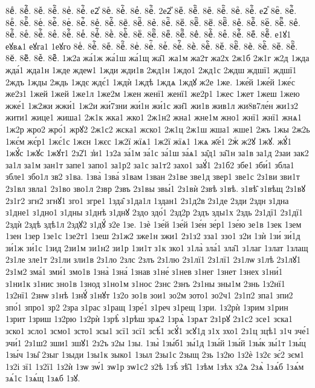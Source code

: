 {8еⷣ.
8еⷣ҇.
8еⷤ.
8еⷤ҇.
8еⷥ.
8еⷥ҇.
е2ⷦ
8еⷦ.
8еⷦ҇.
8еⷧ.
8еⷧ҇.
2е2ⷨ
8еⷨ.
8еⷨ҇.
8еⷩ.
8еⷩ҇.
8еⷪ.
8еⷪ҇.
е2ⷫ
8еⷫ.
8еⷫ҇.
8еⷬ.
8еⷬ҇.
8еⷭ.
8еⷭ҇.
8еⷮ.
8еⷮ҇.
8еⷯ.
8еⷯ҇.
8еⷰ.
8еⷰ҇.
8еⷱ.
8еⷱ҇.
8еⷲ.
8еⷲ҇.
8еⷳ.
8еⷳ҇.
8еⷴ.
8еⷴ҇.
8еⷵ.
8еⷵ҇.
8еⷶ.
8еⷶ҇.
8еⷷ.
8еⷷ҇.
8еⷸ.
8еⷸ҇.
8еⷹ.
8еⷹ҇.
8еⷺ.
8еⷺ҇.
8еⷻ.
8еⷻ҇.
8еⷼ.
8еⷼ҇.
8еⷽ.
8еⷽ҇.
8еⷾ.
8еⷾ҇.
8еⷿ.
8еⷿ҇.
е1ꙋ1
еꙋвѧ1
еꙋга1
1еꙋго
8еꙴ.
8еꙴ҇.
8еꙵ.
8еꙵ҇.
8еꙶ.
8еꙶ҇.
8еꙷ.
8еꙷ҇.
8еꙸ.
8еꙸ҇.
8еꙹ.
8еꙹ҇.
8еꙺ.
8еꙺ҇.
8еꙻ.
8еꙻ҇.
8е꙼.
8е꙼҇.
8е꙽.
8е꙽҇.
1ж2а
жа́1ж
жа́1ш
жа́1щ
жа̑1
жа1м
жа2т
жа2х
2ж1б
2ж1г
ж2д
1жда
жда́1
жда1н
1жде
ждеѡ1
1жди
жди1в
2жд1н
1ждо1
2жд1с
2ждш
ждшї1
ждшї1
2ждъ
1жды
2ждь
1ждє
ждє́1
1ждѝ
1ждѣ
1ждѧ
1ждꙋ
ж2е
1же.
1же́й
1же́й
1же́с
же2з1
1жей
1жей
1же1л
1же2м
1жен
женї1
женї1
же2р1
1жес
1жет
1жеш
1жею
жже́1
1ж2жи
жжи́1
1ж2и
жи́7зни
жи́1н
жи́1с
жи̑1
жи1в
жив1л
жи8в7ле́н
жи1з2
жити1
жице1
жиша1
2ж1к
жка1
жко1
2ж1н2
жна1
жне1м
жно1
жнї1
жнї1
жнѧ1
1ж2р
жро2
жро́1
жрꙋ2
2ж1с2
жска1
жско1
2ж1ц
2ж1ш
жша1
жше1
2жъ
1жы
2ж2ь
1жє́м
жє́р1
1жє́1с
1жєн
1жєс
1ж2ї
жїѧ1
1ж2ї
жїѧ1
1жѧ
ж҃е́1
2жⷭ
ж2ꙋ
1жꙋ.
жꙋ́1
1жꙋ́с
1жꙋс
1жꙋт1
2з2̾1
з̾и1
1з2а
за́1м
за́1с
за́1ш
за́ѧ1
за̑д1
за̑1н
за1в
за1д
2заи
зак2
за1л
за1м
зан1т
запе1
запо1
за1р2
за1с
за1т2
захо1
заꙋ́1
2з1б2
збе1
зби́1
збла1
збле1
збо1л
зв2
з1ва.
1зва̀
1зва́
з1вам
1зван
2з1ве
зве1д
звер1
зве1с
2з1ви
зви1т
2з1вл
звла1
2з1во
зво1л
2звр
2звъ
2з1вы
звы́1
2з1вѝ
2звѣ
з1вѣ.
з1вѣ̑
з1вѣщ
2з1вꙋ
2з1г2
згн2
згнꙋ1
зго1
згре1
1зда̑
з1да1л
1здан1
2з1д2в
2з1де
2зди
2здн
з1дна
з1дне1
з1дно1
з1дны
з1днѣ
з1днꙋ
2здо
здо́1
2зд2р
2здъ
зды1х
2здь
2з1дї1
2з1дї1
2здѝ
2здѣ
здѣ1л
2здꙋ2
з1дꙋ́
з2е
1зе.
1зѐ
1зе́й
1зе́й
1зе́н
зе́р1
1зе́ю
зе1в
1зек
1зем
1зен
1зер
1зе1с
1зе2т1
1зеш
2з1ж2
зже1н
зжи1
2з1з2
зза1
ззо1
з2и
1зѝ
1зи́
зи́1д
зи́1ж
зи́1с
1зид
2зи1м
зи1н2
зи1р
1зи1т
з1к
зко1
з1ла̀
зла́1
зла̑1
з1лаг
1злат
1злащ
2з1ле
зле1т
2з1ли
зли1в
2з1ло
2злс
2злъ
2з1лю
2з1лї1
2з1лї1
2з1лѡ
з1лѣ
2з1лꙋ1
2з1м2
зма́1
зми́1
змо1в
1зна̀
1зна́
1знав
з1не́
з1нев
з1нег
1знет
1знех
з1ни́1
з1ни1к
з1нис
зно1в
1знод
з1но1м
з1нос
2знс
2знъ
2з1ны
зны1м
2знь
1з2нї1
1з2нї1
2знѡ
з1нѣ
1знꙋ́
з1нꙋт
1з2о
зо1в
зои1
зо2м
зото1
зо2ч1
2з1п2
зпа1
зпи2
зпо́1
зпро1
зр2
2зра
з1рас
з1ращ
1зре́1
з1реч
з1рещ
1зри.
1з2рѝ
1зрим
з1рин
1зрит
1зриш
1з2рю
1з2рѝ
1зрѣ̀
з1рѣш
зрѧ2
1зрѧ̀
1зрѧт
2з1рꙋ
2з1с2
зсе1
зска1
зско1
зсло1
зсмо1
зсто1
зсы1
зсї1
зсї1
зсѣ́1
зсꙋ́1
зсꙋ1д
з1х
зхо1
2з1ц
зцѣ1
з1ч
зче́1
зчи́1
2з1ш2
зши1
зшꙋ1
2з2ъ
з2ы
1зы.
1зы̀
1зы́б1
зы́1д
1зы́й
1зы́й
1зы́к
зы́1т
1зы́ц
1зы́ч
1зы̑
2зыг
1зыди
1зы1к
зыко1
1зыл
2зы1с
2зыщ
2зь
1з2ю
1з2ѐ
1з2є
зє́2
зєм1
1з2і
зї1
1з2ї1
1з2ѝ
1зѡ
зѡ́1
зѡ1р
зѡ1с2
з2ѣ
1зѣ̀
зѣ̑1
1зѣм
1зѣх
з2ѧ
2зѧ̀
1зѧ́б
1зѧ́м
зѧ́1с
1зѧ́щ
1зѧб
1зꙋ.
}
